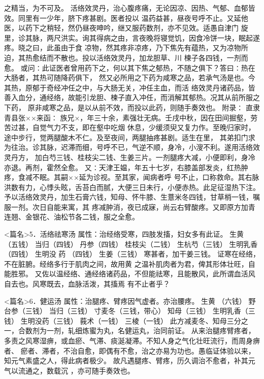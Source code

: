 \documentclass[a4paper,12pt,UTF8,twoside]{ctexbook}
\begin{document}
之精当，为不可及。 
活络效灵丹，治心腹疼痛，无论因凉、因热、气郁、血郁皆效。同里有一少年，脐下疼甚剧。医者投以 
温药益甚，昼夜号呼不止。又延他医，以药下之稍轻，然仍昼夜呻吟，继又服药数剂，亦不见效。适愚自津门 
旋里，诊其脉，两尺洪实。询其得病之由，言夜晚将寝觉饥，因食冷饼一块，眠起遂疼。晓之曰，此虽由于食 
凉物，然其疼非凉疼，乃下焦先有蕴热，又为凉物所迫，其热愈结而不散也。投以活络效灵丹，加龙胆草、川 
楝子各四钱，一剂而愈。 
或问∶此证医者曾用药下之，何以其下焦之郁热，不随之俱下？答曰∶热在大肠者，其热可随降药俱下， 
然又必所用之下药为咸寒之品，若承气汤是也。今其热，原郁于奇经冲任之中，与大肠无关，冲任主血，而活 
络效灵丹诸药品，皆善入血分，通经络，故能引龙胆、楝子直入冲任，而消解其郁热。况其从前所服之下药， 
原非咸寒之品，是以从前不效，而投以此药，则随手奏效也。 
附录∶ 
直隶青县张××来函∶ 
族兄×，年三十余，素强壮无病。壬戌中秋，因在田间掘壑，劳苦过甚，自觉气力不支，即在壑中吃烟 
休息，少缓须臾又复力作。至晚归家时，途中步行，觉两腿酸木不仁。及至夜间，两腿抽疼甚剧。适生在里， 
其弟扣门求为往治。诊其脉，迟滞而细，号呼不已，气逆不顺，身冷，小溲不利。遂用活络效灵丹方， 
加白芍三钱、桂枝尖二钱、生姜三片。一剂腿疼大减，小便即利，身冷亦退。再剂，霍然全愈。 
又∶天津王媪，年五十七岁，右膝盖部发炎，红热肿疼，食减不眠。其嗣××延为诊视。至其家，闻病者呼 
号不止，口称救命。其右脉洪数有力，心悸头眩，舌苔白而腻，大便三日未行，小便赤热。此足征湿热下注。 
予以活络效灵丹，加生石膏六钱，知母、怀牛膝、生薏米冬四钱，甘草梢一钱，嘱服一剂。次日自能来寓，其 
疼减肿消，夜已成寐，尚云右臂酸疼。又即原方加青连翘、金银花、油松节各二钱，服之全愈。 


<篇名>5．活络祛寒汤
属性：治经络受寒，四肢发搐，妇女多有此证。 
生黄 （五钱） 当归（四钱） 丹参（四钱） 桂枝尖（二钱） 生杭芍（三钱） 生明乳香（四钱） 生明没 
药 
（四钱） 生姜（三钱） 
寒甚者，加干姜三钱。 
证寒在经络，不在脏腑。经络多行于肌肉之间，故用黄 之温补肌肉者为君，俾其形体壮旺，自能胜邪。 
又佐以温经络、通经络诸药品，不但能祛寒，且能散风，此所谓血活风自去也。风寒既去，血脉活泼，其搐焉 
有不止者乎？ 


<篇名>6．健运汤
属性：治腿疼、臂疼因气虚者。亦治腰疼。 
生黄 （六钱） 野台参（三钱） 当归（三钱） 寸麦冬（三钱，带心） 知母（三钱） 生明乳香（三钱） 
生明没药（三钱） 莪术（一钱） 三棱（一钱） 
此方减麦冬、知母三分之一，合数剂为一剂，轧细炼蜜为丸，名健运丸，治同前证。 
从来治腿疼臂疼者，多责之风寒湿痹，或血瘀、气滞、痰涎凝滞。不知人身之气化壮旺流行，而周身痹者、 
瘀者、滞者，不治自愈，即偶有不愈，治之亦易为功也。愚临证体验以来，知元气素盛之人，得此病者极少。 
故凡遇腿疼、臂疼，历久调治不愈者，补其元气以流通之，数载沉 ，亦可随手奏效也。 
\end{document}
